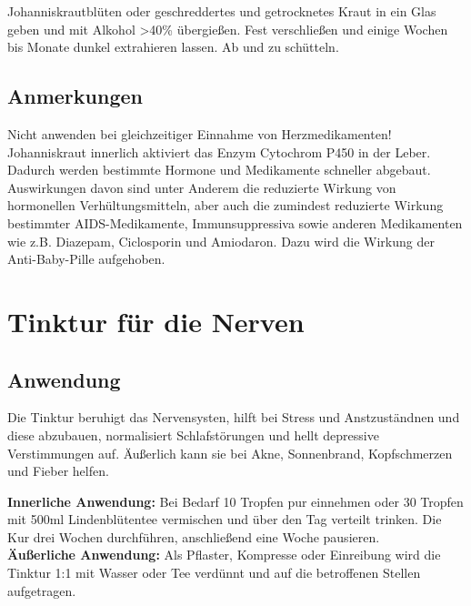 Johanniskrautblüten oder geschreddertes und getrocknetes Kraut in ein Glas geben und mit Alkohol >40\% übergießen. Fest verschließen und einige Wochen bis Monate dunkel extrahieren lassen. Ab und zu schütteln.

\subsection{Anmerkungen}

Nicht anwenden bei gleichzeitiger Einnahme von Herzmedikamenten! Johanniskraut innerlich aktiviert das Enzym Cytochrom P450 in der Leber. Dadurch werden bestimmte Hormone und Medikamente schneller abgebaut. Auswirkungen davon sind unter Anderem die reduzierte Wirkung von hormonellen Verhültungsmitteln, aber auch die zumindest reduzierte Wirkung bestimmter AIDS-Medikamente, Immunsuppressiva sowie anderen Medikamenten wie z.B. Diazepam, Ciclosporin und Amiodaron. Dazu wird die Wirkung der Anti-Baby-Pille aufgehoben.



\newpage



\section{Tinktur für die Nerven}

\cite{nedoma2018heiltinkturen}

         

\subsection{Anwendung}

Die Tinktur beruhigt das Nervensysten, hilft bei Stress und Anstzuständnen und diese abzubauen, normalisiert Schlafstörungen und hellt depressive Verstimmungen auf. Äußerlich  kann sie bei Akne, Sonnenbrand, Kopfschmerzen und Fieber helfen.

\textbf{Innerliche Anwendung:} Bei Bedarf 10 Tropfen pur einnehmen oder 30 Tropfen mit 500ml Lindenblütentee vermischen und über den Tag verteilt trinken. Die Kur drei Wochen durchführen, anschließend eine Woche pausieren.\\ 

\textbf{Äußerliche Anwendung:} Als Pflaster, Kompresse oder Einreibung wird die Tinktur 1:1 mit Wasser oder Tee verdünnt und auf die betroffenen Stellen aufgetragen.\\

